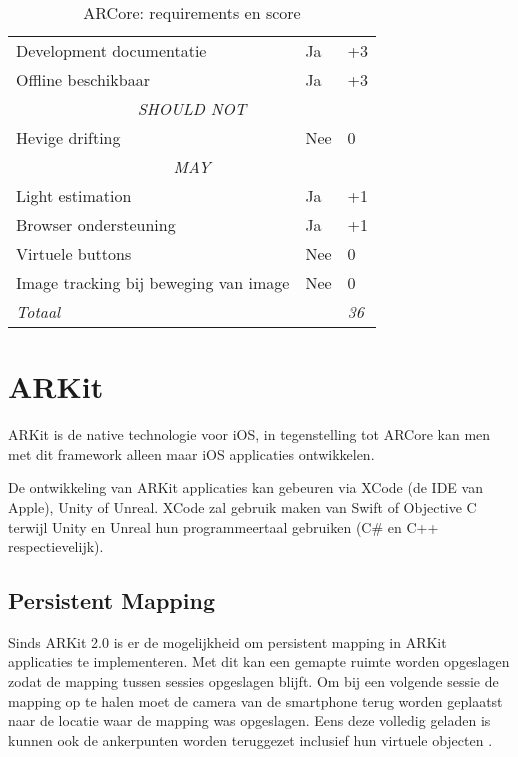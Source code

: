 \begin{table}[]
\begin{tabular}{@{}lll@{}}
        Development documentatie                   & Ja                                 & +3             \\
        Offline beschikbaar                        & Ja                                 & +3             \\ \midrule
        \multicolumn{3}{c}{\textit{SHOULD NOT}}                                                          \\ \midrule
        Hevige drifting                            & Nee                                & 0              \\ \midrule
        \multicolumn{3}{c}{\textit{MAY}}                                                                 \\ \midrule
        Light estimation                           & Ja                                 & +1             \\
        Browser ondersteuning                      & Ja                                 & +1             \\
        Virtuele buttons                           & Nee                                & 0              \\
        Image tracking bij beweging van image      & Nee                                & 0              \\ \midrule
        \textit{Totaal}                            & \multicolumn{1}{r}{}               & \textit{36}    \\ \bottomrule
    \end{tabular}
    \caption{ARCore: requirements en score}
    \label{tbl:arcorereq}
\end{table}

\section{ARKit}
ARKit is de native technologie voor iOS, in tegenstelling tot ARCore kan men met dit framework alleen maar iOS applicaties ontwikkelen.

De ontwikkeling van ARKit applicaties kan gebeuren via XCode (de IDE van Apple), Unity of Unreal. XCode zal gebruik maken van Swift of Objective C terwijl Unity en Unreal hun programmeertaal gebruiken (C\# en C++ respectievelijk).

\subsection{Persistent Mapping}
Sinds ARKit 2.0 is er de mogelijkheid om persistent mapping in ARKit applicaties te implementeren. Met dit kan een gemapte ruimte worden opgeslagen zodat de mapping tussen sessies opgeslagen blijft.
Om bij een volgende sessie de mapping op te halen moet de camera van de smartphone terug worden geplaatst naar de locatie waar de mapping was opgeslagen. Eens deze volledig geladen is kunnen ook de ankerpunten worden teruggezet inclusief hun virtuele objecten \autocite{ARKitPersistent}.

